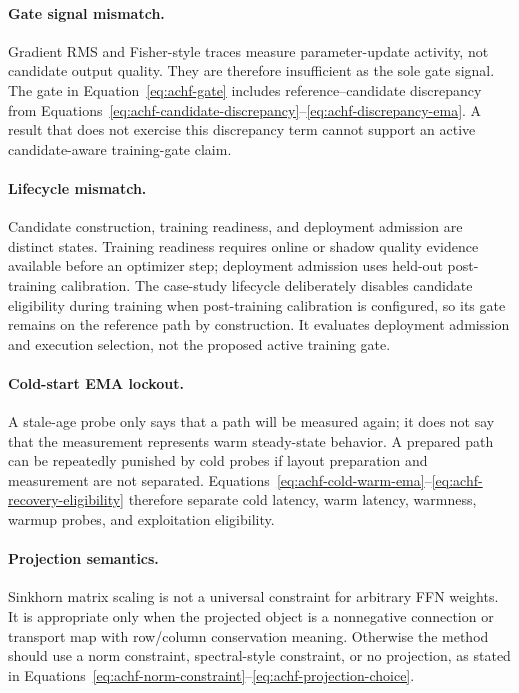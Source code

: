 \documentclass{article}
\begin{document}
\paragraph{Gate signal mismatch.}
Gradient RMS and Fisher-style traces measure parameter-update activity, not
candidate output quality. They are therefore insufficient as the sole gate
signal. The gate in Equation~\eqref{eq:achf-gate} includes
reference--candidate discrepancy from
Equations~\eqref{eq:achf-candidate-discrepancy}--\eqref{eq:achf-discrepancy-ema}.
A result that does not exercise this discrepancy term cannot support an active
candidate-aware training-gate claim.

\paragraph{Lifecycle mismatch.}
Candidate construction, training readiness, and deployment admission are
distinct states. Training readiness requires online or shadow quality evidence
available before an optimizer step; deployment admission uses held-out
post-training calibration. The case-study lifecycle deliberately disables
candidate eligibility during training when post-training calibration is
configured, so its gate remains on the reference path by construction. It
evaluates deployment admission and execution selection, not the proposed active
training gate.

\paragraph{Cold-start EMA lockout.}
A stale-age probe only says that a path will be measured again; it does not say
that the measurement represents warm steady-state behavior. A prepared path can
be repeatedly punished by cold probes if layout preparation and measurement are
not separated. Equations~\eqref{eq:achf-cold-warm-ema}--\eqref{eq:achf-recovery-eligibility}
therefore separate cold latency, warm latency, warmness, warmup probes, and
exploitation eligibility.

\paragraph{Projection semantics.}
Sinkhorn matrix scaling is not a universal constraint for arbitrary FFN weights. It
is appropriate only when the projected object is a nonnegative connection or
transport map with row/column conservation meaning. Otherwise the method should
use a norm constraint, spectral-style constraint, or no projection, as stated
in Equations~\eqref{eq:achf-norm-constraint}--\eqref{eq:achf-projection-choice}.
\end{document}
